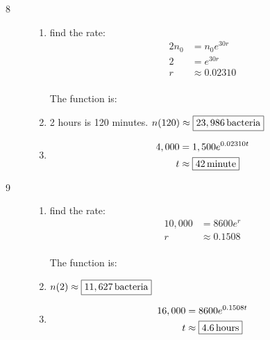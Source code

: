 \documentclass{exam}
\begin{document}
\begin{description}
      \item[8] 
        \begin{enumerate}[a]
          \item find the rate:
            \begin{align*}
              2n_0 & = n_0 e^{30r} \\
              2    & =  e^{30r} \\
              r    & \approx 0.02310 \\
            \end{align*}

            The function is: 

          \item 2 hours is 120 minutes.  $n(120) \approx \boxed{\unit[23,986]{bacteria}}$

          \item 
            \begin{align*}
              4,000 & = 1,500 e^{0.02310 t} \\
              t     & \approx \boxed{\unit[42]{minute}} \\
            \end{align*}

        \end{enumerate}

      \item[9] 
        \begin{enumerate}[a]
          \item find the rate:
            \begin{align*}
              10,000 & = 8600 e^{r} \\
              r      & \approx 0.1508 \\
            \end{align*}

            The function is: 

          \item $n(2) \approx \boxed{\unit[11,627]{bacteria}}$

          \item 
            \begin{align*}
              16,000 & = 8600 e^{0.1508 t} \\
              t      & \approx \boxed{\unit[4.6]{hours}} \\
            \end{align*}

        \end{enumerate}


\end{description}
\end{document}
